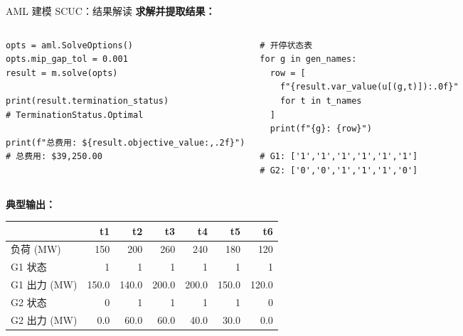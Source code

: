 \documentclass[10pt,aspectratio=169]{beamer}
\begin{document}
\begin{frame}[fragile]{AML 建模 SCUC：结果解读}
  \textbf{求解并提取结果：}

  \begin{columns}[T]
    \begin{lstlisting}
opts = aml.SolveOptions()
opts.mip_gap_tol = 0.001
result = m.solve(opts)

print(result.termination_status)
# TerminationStatus.Optimal

print(f"总费用: ${result.objective_value:,.2f}")
# 总费用: $39,250.00
    \end{lstlisting}

    \begin{lstlisting}
# 开停状态表
for g in gen_names:
  row = [
    f"{result.var_value(u[(g,t)]):.0f}"
    for t in t_names
  ]
  print(f"{g}: {row}")

# G1: ['1','1','1','1','1','1']
# G2: ['0','0','1','1','1','0']
    \end{lstlisting}
  \end{columns}

  \vspace{6pt}
  \textbf{典型输出：}
  \begin{center}
  \footnotesize
  \begin{tabular}{@{}lrrrrrr@{}}
    \toprule
    & t1 & t2 & t3 & t4 & t5 & t6 \\
    \midrule
    负荷 (MW) & 150 & 200 & 260 & 240 & 180 & 120 \\
    G1 状态   & 1 & 1 & 1 & 1 & 1 & 1 \\
    G1 出力 (MW) & 150.0 & 140.0 & 200.0 & 200.0 & 150.0 & 120.0 \\
    G2 状态   & 0 & 1 & 1 & 1 & 1 & 0 \\
    G2 出力 (MW) & 0.0 & 60.0 & 60.0 & 40.0 & 30.0 & 0.0 \\
    \bottomrule
  \end{tabular}
  \end{center}
\end{frame}
\end{document}
